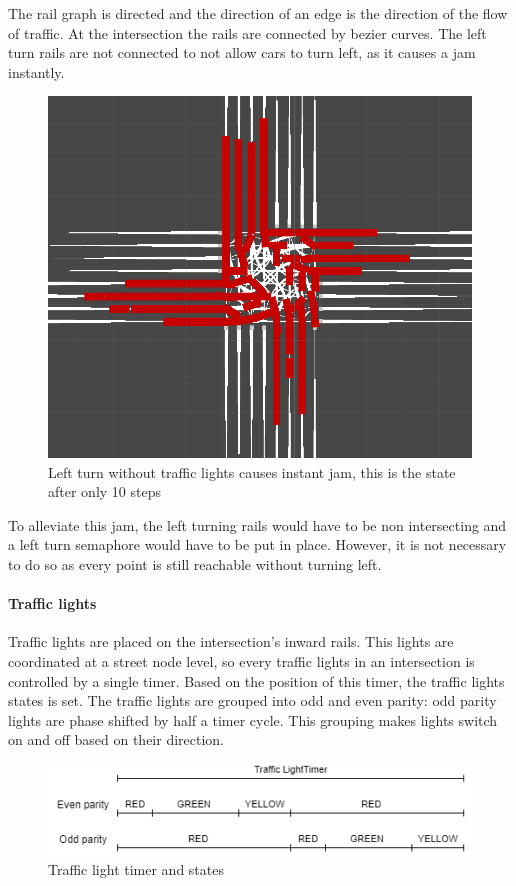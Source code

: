 \documentclass[12pt]{article}
\begin{document}
\bigskip 
 The rail graph is directed and the direction of an edge is the direction of the flow of traffic. At the intersection the rails are connected by bezier curves. The left turn rails are not connected to not allow cars to turn left, as it causes a jam instantly.
\begin{figure}[H]
\includegraphics[width=\textwidth]{gridlock}
\caption{Left turn without traffic lights causes instant jam, this is the state after only 10 steps}
\end{figure}
\bigskip 
 To alleviate this jam, the left turning rails would have to be non intersecting and a left turn semaphore would have to be put in place. However, it is not necessary to do so as every point is still reachable without turning left.

\paragraph{Traffic lights}
Traffic lights are placed on the intersection's inward rails. This lights are coordinated at a street node level, so every traffic lights in an intersection is controlled by a single timer. Based on the position of this timer, the traffic lights states is set. The traffic lights are grouped into odd and even parity: odd parity lights are phase shifted by half a timer cycle. This grouping makes lights switch on and off based on their direction.
\begin{figure}[H]
\includegraphics[width=\textwidth]{semaphore}
\caption{Traffic light timer and states}
\end{figure}
\end{document}
